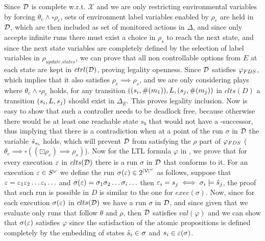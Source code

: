 	Since $\mathcal{D}$ is complete w.r.t. $\mathcal{X}$ and we are only restricting environmental variables by forcing $\theta_e \wedge \square\rho_e$, sets of environment label variables enabled by $\rho_e$ are held in $\mathcal{D}$, which are then included as set of monitored actions in $\Delta$, and since \fdsD only accepts infinite runs there must exist a choice in $\rho_s$ to reach the next state, and since the next state variables are completely defined by the selection of label variables in $\rho_{update.states}$, we can prove that all non controllable options from $E$ at each state are kept in $ctrl(\mathcal{D})$, proving legality openness.
	Since $\mathcal{D}$ satisfies $\varphi_{FDS}$, which implies that it also satisfies $\rho_e \implies \rho_s$, and we are only considering plays where $\theta_e \wedge \square \rho_e$ holds, for any transition $((s_i, \#(m_1)),L,(s_j,\#(m_j))$ in $clts(D)$ a transition $(s_i, L, s_j)$ should exist in $\Delta_E$. This proves legality inclusion. Now is easy to show that such a controller needs to be deadlock free, because otherwise there would be at least one reachable state $s_b$ that would not have a \fdsD-successor, thus implying that there is a contradiction when at a point of the run $\sigma$ in $\mathcal{D}$ the variable $\hat{s}_{s_b}$ holds, which will prevent $\mathcal{D}$ from satisfying the $\rho$ part of $\varphi_{FDS}$ ($\theta_e \implies \square((\boxdot \rho_e) \implies \rho_s)$).  
Now for the LTL formula $\varphi$ in \controlProblem, we prove that for every execution $\varepsilon$ in $clts(\mathcal{D})$ there is a run $\sigma$ in $\mathcal{D}$ that conforms to it.
For an execution $\varepsilon \in S^{\omega}$ we define the run $\sigma(\varepsilon) \in 2^{|\mathcal{V}|^{\omega}}$ as follows, suppose that $\varepsilon= \varepsilon_1 \varepsilon_2 \ldots \varepsilon_i \ldots$ and $\sigma(\varepsilon) = \sigma_1 \sigma_2 \ldots \sigma_i \ldots$ 
 then $\varepsilon_i = s_j \iff \sigma_i \models \hat{s}_{j}$, the proof that such run is possible in $D$ is similar to the one for $exec(\sigma)$.
Now, since for each execution $\sigma(\varepsilon)$ in $clts(\mathcal{D})$ we have a run $\sigma$ in $\mathcal{D}$, and since given that we evaluate only runs that follow $\theta$ and $\rho$, then $\mathcal{D}$ satisfies $val(\varphi)$ and we can show that $\sigma(\varepsilon)$ satisfies $\varphi$ since the satisfaction of the atomic propositions is defined completely by the embedding of states $\hat{s}_{i} \in \sigma$ and $s_i \in \varepsilon(\sigma)$.
